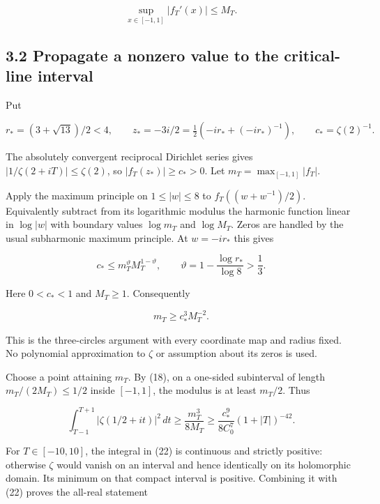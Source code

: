 \[
 \sup_{x\in[-1,1]}|f_T'(x)|\le M_T.                                    \tag{18}
\]

\subsection{3.2 Propagate a nonzero value to the critical-line
interval}\label{propagate-a-nonzero-value-to-the-critical-line-interval}

Put

\[
 r_*=(3+\sqrt{13})/2<4,\qquad
 z_*=-3i/2=\tfrac12(-ir_*+(-ir_*)^{-1}),\qquad
 c_* =\zeta(2)^{-1}.                                                    \tag{19}
\]

The absolutely convergent reciprocal Dirichlet series gives
\(|1/\zeta(2+iT)|\le\zeta(2)\), so \(|f_T(z_*)|\ge c_*>0\). Let
\(m_T=\max_{[-1,1]}|f_T|\).

Apply the maximum principle on \(1\le|w|\le8\) to \(f_T((w+w^{-1})/2)\).
Equivalently subtract from its logarithmic modulus the harmonic function
linear in \(\log|w|\) with boundary values \(\log m_T\) and
\(\log M_T\). Zeros are handled by the usual subharmonic maximum
principle. At \(w=-ir_*\) this gives

\[
 c_*\le m_T^{\vartheta}M_T^{1-\vartheta},\qquad
 \vartheta=1-\frac{\log r_*}{\log8}>\frac13.
                                                                         \tag{20}
\]

Here \(0<c_*<1\) and \(M_T\ge1\). Consequently

\[
 m_T\ge c_*^3M_T^{-2}.                                                 \tag{21}
\]

This is the three-circles argument with every coordinate map and radius
fixed. No polynomial approximation to \(\zeta\) or assumption about its
zeros is used.

Choose a point attaining \(m_T\). By (18), on a one-sided subinterval of
length \(m_T/(2M_T)\le1/2\) inside \([-1,1]\), the modulus is at least
\(m_T/2\). Thus

\[
 \int_{T-1}^{T+1}|\zeta(1/2+it)|^2\,dt
 \ge \frac{m_T^3}{8M_T}
 \ge \frac{c_*^9}{8C_0^7}(1+|T|)^{-42}.                                \tag{22}
\]

For \(T\in[-10,10]\), the integral in (22) is continuous and strictly
positive: otherwise \(\zeta\) would vanish on an interval and hence
identically on its holomorphic domain. Its minimum on that compact
interval is positive. Combining it with (22) proves the all-real
statement


